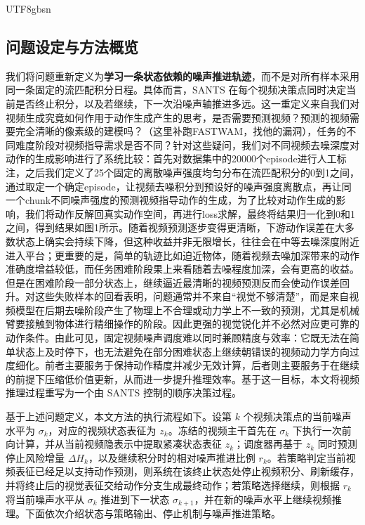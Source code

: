 \documentclass{article}
\begin{document}
\begin{CJK*}{UTF8}{gbsn}
\begin{itemize}
  \subsection{问题设定与方法概览}


我们将问题重新定义为\textbf{学习一条状态依赖的噪声推进轨迹}，而不是对所有样本采用同一条固定的流匹配积分日程。具体而言，SANTS 在每个视频决策点同时决定当前是否终止积分，以及若继续，下一次沿噪声轴推进多远。这一重定义来自我们对视频生成究竟如何作用于动作生成产生的思考，是否需要预测视频？预测的视频需要完全清晰的像素级的建模吗？（这里补跑FASTWAM，找他的漏洞），任务的不同难度阶段对视频指导需求是否不同？针对这些疑问，我们对不同视频去噪深度对动作的生成影响进行了系统比较：首先对数据集中的20000个episode进行人工标注，之后我们定义了25个固定的离散噪声强度均匀分布在流匹配积分的0到1之间，通过取定一个确定episode，让视频去噪积分到预设好的噪声强度离散点，再让同一个chunk不同噪声强度的预测视频指导动作的生成，为了比较对动作生成的影响，我们将动作反解回真实动作空间，再进行loss求解，最终将结果归一化到0和1之间，得到结果如图1所示。随着视频预测逐步变得更清晰，下游动作误差在大多数状态上确实会持续下降，但这种收益并非无限增长，往往会在中等去噪深度附近进入平台；更重要的是，简单的轨迹比如迫近物体，随着视频去噪加深带来的动作准确度增益较低，而任务困难阶段果上来看随着去噪程度加深，会有更高的收益。但是在困难阶段一部分状态上，继续逼近最清晰的视频预测反而会使动作误差回升。对这些失败样本的回看表明，问题通常并不来自“视觉不够清楚”，而是来自视频模型在后期去噪阶段产生了物理上不合理或动力学上不一致的预测，尤其是机械臂要接触到物体进行精细操作的阶段。因此更强的视觉锐化并不必然对应更可靠的动作条件。由此可见，固定视频噪声调度难以同时兼顾精度与效率：它既无法在简单状态上及时停下，也无法避免在部分困难状态上继续朝错误的视频动力学方向过度细化。前者主要服务于保持动作精度并减少无效计算，后者则主要服务于在继续的前提下压缩低价值更新，从而进一步提升推理效率。基于这一目标，本文将视频推理过程重写为一个由 SANTS 控制的顺序决策过程。


基于上述问题定义，本文方法的执行流程如下。设第 \(k\) 个视频决策点的当前噪声水平为 \(\sigma_k\)，对应的视频状态表征为 \(z_k\)。冻结的视频主干首先在 \(\sigma_k\) 下执行一次前向计算，并从当前视频隐表示中提取紧凑状态表征 \(z_k\)；调度器再基于 \(z_k\) 同时预测停止风险增量 \(\Delta H_k\)，以及继续积分时的相对噪声推进比例 \(r_k\)。若策略判定当前视频表征已经足以支持动作预测，则系统在该终止状态处停止视频积分、刷新缓存，并将终止后的视觉表征交给动作分支生成最终动作；若策略选择继续，则根据 \(r_k\) 将当前噪声水平从 \(\sigma_k\) 推进到下一状态 \(\sigma_{k+1}\)，并在新的噪声水平上继续视频推理。下面依次介绍状态与策略输出、停止机制与噪声推进策略。


\end{itemize}
\end{CJK*}
\end{document}
